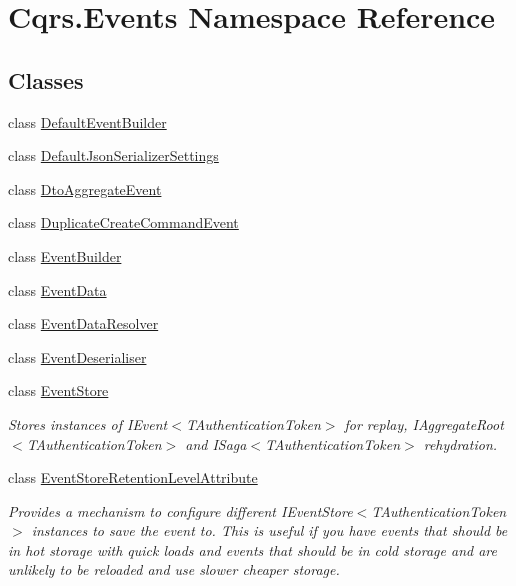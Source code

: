 \hypertarget{namespaceCqrs_1_1Events}{}\section{Cqrs.\+Events Namespace Reference}
\label{namespaceCqrs_1_1Events}
\subsection*{Classes}
\begin{DoxyCompactItemize}
\item 
class \hyperlink{classCqrs_1_1Events_1_1DefaultEventBuilder}{Default\+Event\+Builder}
\item 
class \hyperlink{classCqrs_1_1Events_1_1DefaultJsonSerializerSettings}{Default\+Json\+Serializer\+Settings}
\item 
class \hyperlink{classCqrs_1_1Events_1_1DtoAggregateEvent}{Dto\+Aggregate\+Event}
\item 
class \hyperlink{classCqrs_1_1Events_1_1DuplicateCreateCommandEvent}{Duplicate\+Create\+Command\+Event}
\item 
class \hyperlink{classCqrs_1_1Events_1_1EventBuilder}{Event\+Builder}
\item 
class \hyperlink{classCqrs_1_1Events_1_1EventData}{Event\+Data}
\item 
class \hyperlink{classCqrs_1_1Events_1_1EventDataResolver}{Event\+Data\+Resolver}
\item 
class \hyperlink{classCqrs_1_1Events_1_1EventDeserialiser}{Event\+Deserialiser}
\item 
class \hyperlink{classCqrs_1_1Events_1_1EventStore}{Event\+Store}
\begin{DoxyCompactList}\small\item\em Stores instances of I\+Event$<$\+T\+Authentication\+Token$>$ for replay, I\+Aggregate\+Root$<$\+T\+Authentication\+Token$>$ and I\+Saga$<$\+T\+Authentication\+Token$>$ rehydration. \end{DoxyCompactList}\item 
class \hyperlink{classCqrs_1_1Events_1_1EventStoreRetentionLevelAttribute}{Event\+Store\+Retention\+Level\+Attribute}
\begin{DoxyCompactList}\small\item\em Provides a mechanism to configure different I\+Event\+Store$<$\+T\+Authentication\+Token$>$ instances to save the event to. This is useful if you have events that should be in hot storage with quick loads and events that should be in cold storage and are unlikely to be reloaded and use slower cheaper storage. \end{DoxyCompactList}\item 

\end{DoxyCompactItemize}
